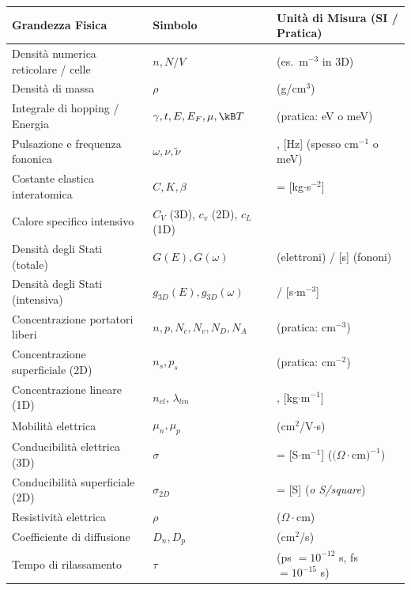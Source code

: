 \begin{table}[htpb]
\centering
\renewcommand{\arraystretch}{1.3}
{\small
\begin{tabular}{>{\raggedright\arraybackslash}p{5.5cm} >{\raggedright\arraybackslash}p{4.2cm} >{\raggedright\arraybackslash}p{6.5cm}}
\toprule
\textbf{Grandezza Fisica} & \textbf{Simbolo} & \textbf{Unità di Misura (SI / Pratica)} \\
\midrule
Densità numerica reticolare / celle & $n, N/V$ & [m$^{-d}$] \quad (es.\ m$^{-3}$ in 3D) \\
Densità di massa & $\rho$ & [kg$\cdot$m$^{-3}$] \quad (g/cm$^3$) \\
Integrale di hopping / Energia & $\gamma, t, E, E_F, \mu, \kB T$ & [J] \quad (pratica: eV o meV) \\
Pulsazione e frequenza fononica & $\omega, \nu, \tilde\nu$ & [rad$\cdot$s$^{-1}$], [Hz] \quad (spesso cm$^{-1}$ o meV) \\
Costante elastica interatomica & $C, K, \beta$ & [N$\cdot$m$^{-1}$] = [kg$\cdot$s$^{-2}$] \\
Calore specifico intensivo & $C_V$ (3D), $c_v$ (2D), $c_L$ (1D) & [J$\cdot$K$^{-1}\cdot$m$^{-d}$] \\
Densità degli Stati (totale) & $G(E), G(\omega)$ & [J$^{-1}$] (elettroni) / [s] (fononi) \\
Densità degli Stati (intensiva) & $g_{3D}(E), g_{3D}(\omega)$ & [J$^{-1}\cdot$m$^{-3}$] / [s$\cdot$m$^{-3}$] \\
Concentrazione portatori liberi & $n, p, N_c, N_v, N_D, N_A$ & [m$^{-3}$] \quad (pratica: cm$^{-3}$) \\
Concentrazione superficiale (2D) & $n_s, p_s$ & [m$^{-2}$] \quad (pratica: cm$^{-2}$) \\
Concentrazione lineare (1D) & $n_{el}$, $\lambda_{lin}$ & [m$^{-1}$], [kg$\cdot$m$^{-1}$] \\
Mobilità elettrica & $\mu_n, \mu_p$ & [m$^2\cdot$V$^{-1}\cdot$s$^{-1}$] \quad (cm$^2$/V$\cdot$s) \\
Conducibilità elettrica (3D) & $\sigma$ & [$\Omega^{-1}\cdot$m$^{-1}$] = [S$\cdot$m$^{-1}$] \quad ($(\Omega\cdot$cm$)^{-1}$) \\
Conducibilità superficiale (2D) & $\sigma_{2D}$ & [$\Omega^{-1}$] = [S] \quad (\textit{o S/square}) \\
Resistività elettrica & $\rho$ & [$\Omega\cdot$m] \quad ($\Omega\cdot$cm) \\
Coefficiente di diffusione & $D_n, D_p$ & [m$^2\cdot$s$^{-1}$] \quad (cm$^2$/s) \\
Tempo di rilassamento & $\tau$ & [s] \quad (ps $=10^{-12}$ s, fs $=10^{-15}$ s) \\
\bottomrule
\end{tabular}}
\end{table}

